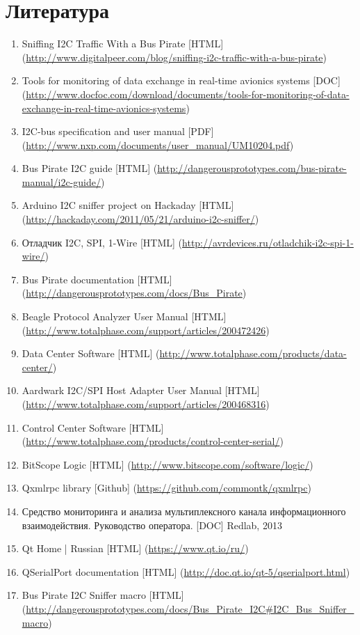 \section{Литература}

\begin{enumerate}
 \sloppy
 \item \label{i2c_sniffing} Sniffing I2C Traffic With a Bus Pirate [HTML] (\url{http://www.digitalpeer.com/blog/sniffing-i2c-traffic-with-a-bus-pirate})
 \item \label{monitoring_tools} Tools for monitoring of data exchange in real-time avionics systems [DOC] (\url{http://www.docfoc.com/download/documents/tools-for-monitoring-of-data-exchange-in-real-time-avionics-systems})
 \item \label{i2c_protocol_spec} I2C-bus specification and user manual [PDF] (\url{http://www.nxp.com/documents/user_manual/UM10204.pdf})
 \item \label{buspirate_i2c} Bus Pirate I2C guide [HTML] (\url{http://dangerousprototypes.com/bus-pirate-manual/i2c-guide/})
 \item \label{arduino-i2c-sniffer} Arduino I2C sniffer project on Hackaday [HTML] (\url{http://hackaday.com/2011/05/21/arduino-i2c-sniffer/})
 \item \label{i2c-spi-1w-debugger} Отладчик I2C, SPI, 1-Wire [HTML] (\url{http://avrdevices.ru/otladchik-i2c-spi-1-wire/})
 \item \label{buspirate_descr} Bus Pirate documentation [HTML] (\url{http://dangerousprototypes.com/docs/Bus_Pirate})
 \item \label{beagle_protocol_analyzer} Beagle Protocol Analyzer User Manual [HTML] (\url{http://www.totalphase.com/support/articles/200472426})
 \item \label{tp_data_center} Data Center Software [HTML] (\url{http://www.totalphase.com/products/data-center/})
 \item \label{aardwark_adapter} Aardwark I2C/SPI Host Adapter User Manual [HTML] (\url{http://www.totalphase.com/support/articles/200468316})
 \item \label{tp_control_center} Control Center Software [HTML] (\url{http://www.totalphase.com/products/control-center-serial/})
 \item \label{bitscope_logic} BitScope Logic [HTML] (\url{http://www.bitscope.com/software/logic/})
 \item \label{qxmlrpc} Qxmlrpc library [Github] (\url{https://github.com/commontk/qxmlrpc})
 \item \label{sma_manual} Средство мониторинга и анализа мультиплексного канала информационного взаимодействия. Руководство оператора. [DOC] Redlab, 2013
 \item \label{qt_home} Qt Home | Russian [HTML] (\url{https://www.qt.io/ru/})
 \item \label{qtserialport} QSerialPort documentation [HTML] (\url{http://doc.qt.io/qt-5/qserialport.html})
 \item \label{buspirate_i2c_snif} Bus Pirate I2C Sniffer macro [HTML] (\url{http://dangerousprototypes.com/docs/Bus_Pirate_I2C#I2C_Bus_Sniffer_macro})
 \end{enumerate}
